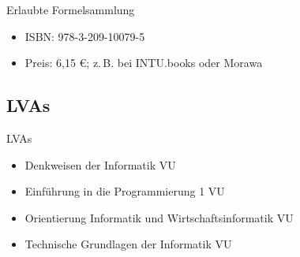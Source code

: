 \documentclass{beamer}
\begin{document}
\begin{frame}{Erlaubte Formelsammlung}
    \begin{figure}[htp]
        \centering
        \hfill
    \end{figure}
    \begin{itemize}
        \item ISBN: 978-3-209-10079-5
        \item Preis: 6{,}15 €; z.\,B. bei INTU.books oder Morawa
    \end{itemize}
\end{frame}

\subsection{LVAs}
\begin{frame}{LVAs}
    \begin{itemize}
        \item Denkweisen der Informatik VU
        \item Einführung in die Programmierung 1 VU
        \item Orientierung Informatik und Wirtschaftsinformatik VU
        \item Technische Grundlagen der Informatik VU
    \end{itemize}
\end{frame}
\end{document}
